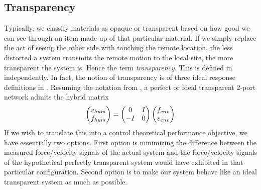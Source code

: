 \subsection{Transparency}
Typically, we classify materials as opaque or transparent based on how good we can see through an item made up of that 
particular material. If we simply replace the act of seeing the other side with touching the remote location, the 
less distorted a system transmits the remote motion to the local site, the more transparent the system is. Hence the 
term \emph{transparency}. This is defined in \cite{lawrence,yokokohjiyoshikawa} independently. In fact, the notion of 
transparency is of three ideal response definitions in \cite{yokokohjiyoshikawa}. Resuming the notation from 
, a perfect or ideal transparent 2-port network admits the hybrid matrix 
\[
\begin{pmatrix}v_{hum}\\f_{hum}\end{pmatrix}=\begin{pmatrix}0&I\\-I&0\end{pmatrix}\begin{pmatrix}f_{env}\\v_{env}\end{pmatrix}
\]
If we wish to translate this into a control theoretical performance objective, we have essentially two options. 
First option is minimizing the difference between the measured force/velocity signals of the actual system and the force/velocity signals 
of the hypothetical perfectly transparent system would have exhibited in that particular configuration. Second option is to make our system 
behave like an ideal transparent system as much as possible. 

